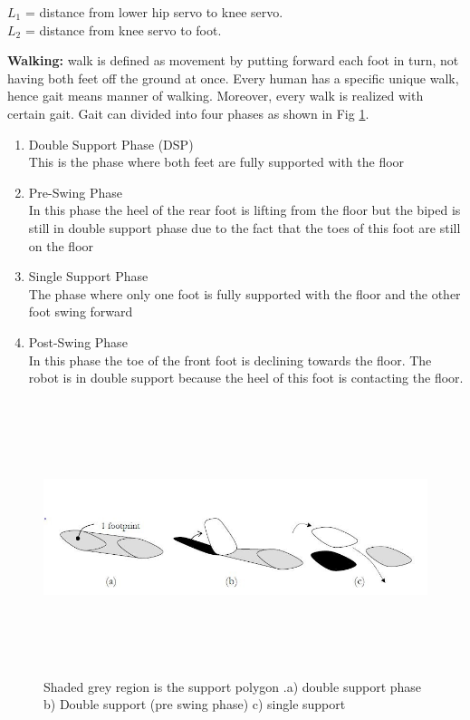 \documentclass[12pt]{article}
\begin{document}
$L_{1}$ = distance from lower hip servo to knee servo.\\
$L_{2}$ = distance from knee servo to foot.

\vspace{1cm}
\flushleft  \textbf{Walking:} walk is defined as movement by putting forward each foot in turn, not having
both feet off the ground at once. Every human has a specific unique walk, hence gait
means manner of walking. Moreover, every walk is realized with certain gait. Gait can
divided into four phases as shown in Fig \ref{fig:footprint}.\\
\begin{enumerate}
	\item Double Support Phase (DSP)\\
	This is the phase where both feet are fully supported with the floor
	\item Pre-Swing Phase\\
	In this phase the heel of the rear foot is lifting from the floor but the biped is still in
	double support phase due to the fact that the toes of this foot are still on the floor
	\item Single Support Phase\\
	The phase where only one foot is fully supported with the floor and the other foot
	swing forward
	\item Post-Swing Phase\\
	In this phase the toe of the front foot is declining towards the floor. The robot is in
	double support because the heel of this foot is contacting the floor.
\end{enumerate}
\newpage
\begin{figure}
	\centering
	\includegraphics[width = 16cm,height= 8cm]{footprint}
	\caption{Shaded grey region is the support polygon \cite{zero}.a) double support phase
		b) Double support (pre swing phase) c) single support}
	\label{fig:footprint}
\end{figure}
\end{document}
